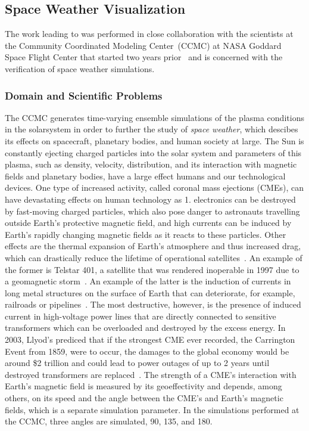\subsection{Space Weather Visualization} \label{contributions:astro:spaceweather}
The work leading to  was performed in close collaboration with the scientists at the Community Coordinated Modeling Center~(CCMC) at NASA Goddard Space Flight Center that started two years prior~\cite{tornros2013interactive, bock14vcmass} and is concerned with the verification of space weather simulations.


\subsubsection{Domain and Scientific Problems} \label{contributions:astro:spaceweather:background}
The CCMC generates time-varying ensemble simulations of the plasma conditions in the solarsystem in order to further the study of \emph{space weather}, which descibes its effects on spacecraft, planetary bodies, and human society at large.  The Sun is constantly ejecting charged particles into the solar system and parameters of this plasma, such as density, velocity, distribution, and its interaction with magnetic fields and planetary bodies, have a large effect humans and our technological devices.  One type of increased activity, called coronal mass ejections (CMEs), can have devastating effects on human technology as 1. electronics can be destroyed by fast-moving charged particles, which also pose danger to astronauts travelling outside Earth's protective magnetic field, and high currents can be induced by Earth's rapidly changing magnetic fields as it reacts to these particles.  Other effects are the thermal expansion of Earth's atmosphere and thus increased drag, which can drastically reduce the lifetime of operational satellites~\cite{knowles2001effect}.  An example of the former is Telstar 401, a satellite that was rendered inoperable in 1997 due to a geomagnetic storm~\cite{sabol1998analysis}.  An example of the latter is the induction of currents in long metal structures on the surface of Earth that can deteriorate, for example, railroads or pipelines~\cite{pirjola1999power}.  The most destructive, however, is the presence of induced current in high-voltage power lines that are directly connected to sensitive transformers which can be overloaded and destroyed by the excess energy.  In 2003, Llyod's prediced that if the strongest CME ever recorded, the Carrington Event from 1859, were to occur, the damages to the global economy would be around \$2 trillion and could lead to power outages of up to 2 years until destroyed transformers are replaced~\cite{maynard2013solar}.  The strength of a CME's interaction with Earth's magnetic field is measured by its geoeffectivity and depends, among others, on its speed and the angle between the CME's and Earth's magnetic fields, which is a separate simulation parameter.  In the simulations performed at the CCMC, three angles are simulated, 90\textdegree , 135\textdegree , and 180\textdegree .

